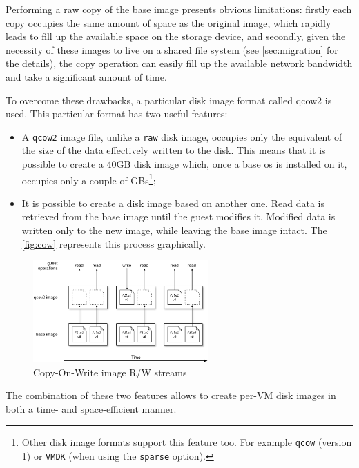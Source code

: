 Performing a raw copy of the base image presents obvious limitations: firstly each copy occupies the same amount of space as the original image, which rapidly leads to fill up the available space on the storage device, and secondly, given the necessity of these images to live on a shared file system (see \autoref{sec:migration} for the details), the copy operation can easily fill up the available network bandwidth and take a significant amount of time.

To overcome these drawbacks, a particular disk image format called \gls{qcow2} is used. This particular format has two useful features:

\begin{itemize}
    \item A \texttt{qcow2} image file, unlike a \texttt{raw} disk image, occupies only the equivalent of the size of the data effectively written to the disk. This means that it is possible to create a 40GB disk image which, once a base \gls{os} is installed on it, occupies only a couple of GBs\footnote{Other disk image formats support this feature too. For example \texttt{qcow} (version 1) or \texttt{VMDK} (when using the \texttt{sparse} option).};
    \item It is possible to create a disk image based on another one. Read data is retrieved from the base image until the guest modifies it. Modified data is written only to the new image, while leaving the base image intact. The \autoref{fig:cow} represents this process graphically.
\end{itemize}

\begin{figure}[h]
	\centering
	\includegraphics[width=0.6\textwidth]{figures/cow-images}
	\caption{Copy-On-Write image R/W streams}
	\label{fig:cow}
\end{figure}

The combination of these two features allows to create per-VM disk images in both a time- and space-efficient manner.



